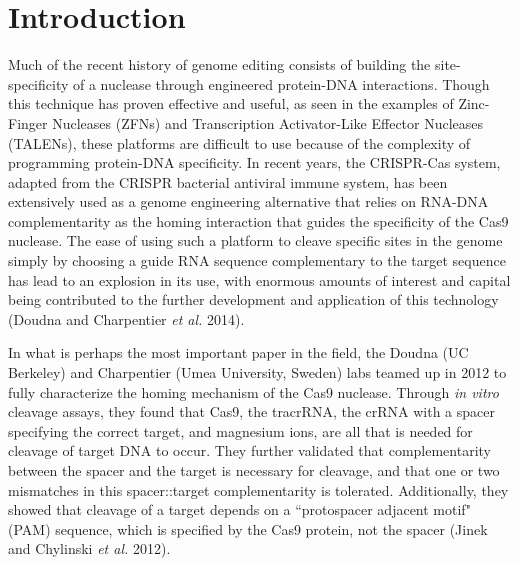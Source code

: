 \documentclass{Dissertate}
\begin{document}

\maketitle

\nocite{*}

\abstractpage

\setcounter{tocdepth}{2}
\tableofcontents
\dedicationpage
\acknowledgments

\doublespacing

\setcounter{chapter}{0}  %

\chapter{Introduction}
\label{introduction}

Much of the recent history of genome editing consists of building the site-specificity of a nuclease through engineered protein-DNA interactions. Though this technique has proven effective and useful, as seen in the examples of Zinc-Finger Nucleases (ZFNs) and Transcription Activator-Like Effector Nucleases (TALENs), these platforms are difficult to use because of the complexity of programming protein-DNA specificity.
In recent years, the CRISPR-Cas system, adapted from the CRISPR bacterial antiviral immune system, has been extensively used as a genome engineering alternative that relies on RNA-DNA complementarity as the homing interaction that guides the specificity of the Cas9 nuclease. The ease of using such a platform to cleave specific sites in the genome simply by choosing a guide RNA sequence complementary to the target sequence has lead to an explosion in its use, with enormous amounts of interest and capital being contributed to the further development and application of this technology (Doudna and Charpentier \textit{et al.} 2014).

In what is perhaps the most important paper in the field, the Doudna (UC Berkeley) and Charpentier (Umea University, Sweden) labs teamed up in 2012 to fully characterize the homing mechanism of the Cas9 nuclease. Through  \textit{in vitro} cleavage assays, they found that Cas9, the tracrRNA, the crRNA with a spacer specifying the correct target, and magnesium ions, are all that is needed for cleavage of target DNA to occur. They further validated that complementarity between the spacer and the target is necessary for cleavage, and that one or two mismatches in this spacer::target complementarity is tolerated. Additionally, they showed that cleavage of a target depends on a ``protospacer adjacent motif" (PAM) sequence, which is specified by the Cas9 protein, not the spacer (Jinek and Chylinski \textit{et al.} 2012).
\end{document}
